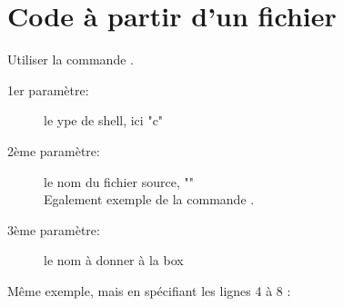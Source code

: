 \section{Code à partir d'un fichier}

Utiliser la commande .
\begin{description}
 \item[1er paramètre:] le ype de shell, ici "c"
 \item[2ème paramètre:] le nom du fichier source, ""\\ Egalement exemple de la commande .
 \item[3ème paramètre:] le nom à donner à la box
\end{description}



Même exemple, mais en spécifiant les lignes 4 à 8 :
